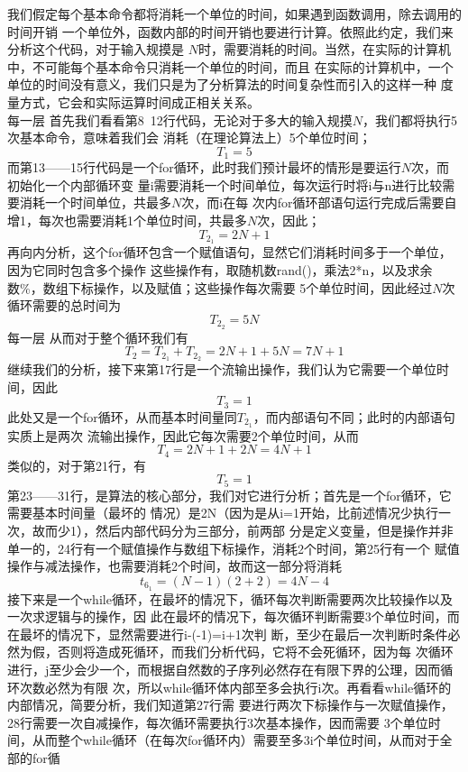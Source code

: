 \documentclass[a4paper,12pt]{ctexart}
\begin{document}
		\indent
		我们假定每个基本命令都将消耗一个单位的时间，如果遇到函数调用，除去调用的时间开销
		一个单位外，函数内部的时间开销也要进行计算。依照此约定，我们来分析这个代码，对于输入规摸是
		$N$时，需要消耗的时间。当然，在实际的计算机中，不可能每个基本命令只消耗一个单位的时间，而且
		在实际的计算机中，一个单位的时间没有意义，我们只是为了分析算法的时间复杂性而引入的这样一种
		度量方式，它会和实际运算时间成正相关关系。\\
		\indent 每一层
		首先我们看看第8~12行代码，无论对于多大的输入规摸$N$，我们都将执行5次基本命令，意味着我们会
		消耗（在理论算法上）5个单位时间；
		$$
		T_1 = 5
		$$
		而第13——15行代码是一个for循环，此时我们预计最坏的情形是要运行$N$次，而初始化一个内部循环变
		量i需要消耗一个时间单位，每次运行时将i与n进行比较需要消耗一个时间单位，共最多$N$次，而i在每
		次内for循环部语句运行完成后需要自增1，每次也需要消耗1个单位时间，共最多$N$次，因此；
		$$
		T_{2_1}=2N+1
		$$
		再向内分析，这个for循环包含一个赋值语句，显然它们消耗时间多于一个单位，因为它同时包含多个操作
		这些操作有，取随机数rand()，乘法2*n，以及求余数\%，数组下标操作，以及赋值；这些操作每次需要
		5个单位时间，因此经过$N$次循环需要的总时间为
		$$
		T_{2_2}=5N
		$$每一层
		从而对于整个循环我们有
		$$
		T_2 = T_{2_1}+T_{2_2} = 2N+1+5N=7N+1
		$$
		继续我们的分析，接下来第17行是一个流输出操作，我们认为它需要一个单位时间，因此
		$$
		T_3 = 1
		$$
		此处又是一个for循环，从而基本时间量同$T_{2_1}$，而内部语句不同；此时的内部语句实质上是两次
		流输出操作，因此它每次需要2个单位时间，从而
		$$
		T_4 = 2N+1+2N = 4N+1
		$$
		类似的，对于第21行，有
		$$
		T_5 = 1
		$$
		第23——31行，是算法的核心部分，我们对它进行分析；首先是一个for循环，它需要基本时间量（最坏的
		情况）是2N（因为是从i=1开始，比前述情况少执行一次，故而少1），然后内部代码分为三部分，前两部
		分是定义变量，但是操作并非单一的，24行有一个赋值操作与数组下标操作，消耗2个时间，第25行有一个
		赋值操作与减法操作，也需要消耗2个时间，故而这一部分将消耗
		$$
		t_{6_1} = (N-1)(2+2) = 4N-4
		$$
		接下来是一个while循环，在最坏的情况下，循环每次判断需要两次比较操作以及一次求逻辑与的操作，因
		此在最坏的情况下，每次循环判断需要3个单位时间，而在最坏的情况下，显然需要进行i-(-1)=i+1次判
		断，至少在最后一次判断时条件必然为假，否则将造成死循环，而我们分析代码，它将不会死循环，因为每
		次循环进行，j至少会少一个，而根据自然数的子序列必然存在有限下界的公理，因而循环次数必然为有限
		次，所以while循环体内部至多会执行i次。再看看while循环的内部情况，简要分析，我们知道第27行需
		要进行两次下标操作与一次赋值操作，28行需要一次自减操作，每次循环需要执行3次基本操作，因而需要
		3个单位时间，从而整个while循环（在每次for循环内）需要至多3i个单位时间，从而对于全部的for循
\end{document}
